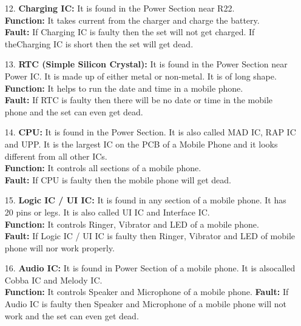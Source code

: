 \begin{itemize}
\item[12.] \textbf{Charging IC:} It is found in the Power Section near R22.\\
\textbf{Function:} It takes current from the charger and charge the battery.\\
\textbf{Fault:} If Charging IC is faulty then the set will not get charged. If theCharging IC is short then the set will get dead.

\item[13.] \textbf{RTC (Simple Silicon Crystal):} It is found in the Power Section near Power IC. It is made up of either metal or non-metal. It is of long shape.\\
\textbf{Function:} It helps to run the date and time in a mobile phone.\\
\textbf{Fault:} If RTC is faulty then there will be no date or time in the mobile phone and the set can even get dead.

\item[14.] \textbf{CPU:} It is found in the Power Section. It is also called MAD IC, RAP IC and UPP. It is the largest IC on the PCB of a Mobile Phone and it looks different from all other ICs.\\
\textbf{Function:} It controls all sections of a mobile phone.\\
\textbf{Fault:} If CPU is faulty then the mobile phone will get dead.

\item[15.] \textbf{Logic IC / UI IC:} It is found in any section of a mobile phone. It has 20 pins or legs. It is also called UI IC and Interface IC.\\
\textbf{Function:} It controls Ringer, Vibrator and LED of a mobile phone.\\
\textbf{Fault:} If Logic IC / UI IC is faulty then Ringer, Vibrator and LED of mobile phone will nor work properly.

\item[16.] \textbf{Audio IC:} It is found in Power Section of a mobile phone. It is alsocalled Cobba IC and Melody IC.\\
\textbf{Function:} It controls Speaker and Microphone of a mobile phone.
\textbf{Fault:} If Audio IC is faulty then Speaker and Microphone of a mobile phone will not work and the set can even get dead.

\end{itemize}


